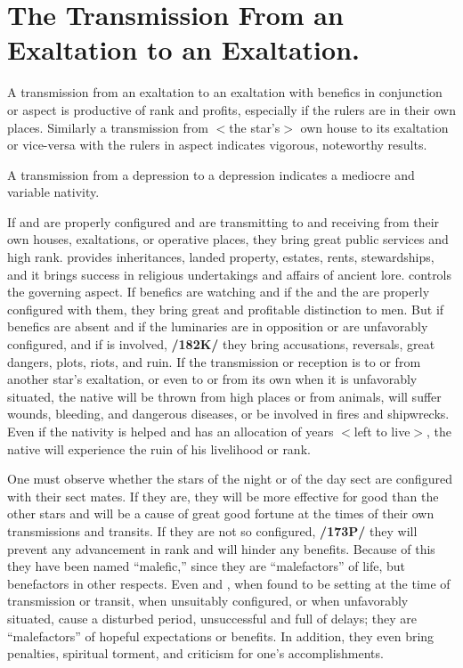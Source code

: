 \section{The Transmission From an Exaltation to an Exaltation.}

A transmission from an exaltation to an exaltation with benefics in conjunction or aspect is productive of rank and profits, especially if the rulers are in their own places. Similarly a transmission from $<$the star’s$>$ own house to its exaltation or vice-versa with the rulers in aspect indicates vigorous, noteworthy results. 

A transmission from a depression to a depression indicates a mediocre and variable nativity.

If \Saturn\xspace and \Mars\xspace are properly configured and are transmitting to and receiving from their own houses,
exaltations, or operative places, they bring great public services and high rank. \Saturn\xspace provides inheritances, landed property, estates, rents, stewardships, and it brings success in religious undertakings and affairs of ancient lore. \Mars\xspace controls the governing aspect. If benefics are watching and if the \Sun\xspace and the \Moon\xspace are properly configured with them, they bring great and profitable distinction to men. But if benefics are absent and if the luminaries are in opposition or are unfavorably configured, and if \Mercury\xspace is involved, \textbf{/182K/} they bring accusations, reversals, great dangers, plots, riots, and ruin.
If the transmission or reception is to or from another star’s exaltation, or even to or from its own when it is unfavorably
situated, the native will be thrown from high places or from animals, will suffer wounds, bleeding, and dangerous diseases, or be involved in fires and shipwrecks. Even if the nativity is helped and has an allocation of years $<$left to live$>$, the native will experience the ruin of his livelihood or rank.

One must observe whether the stars of the night or of the day sect are configured with their sect mates. If they are, they will be more effective for good than the other stars and will be a cause of great good fortune at the times of their own transmissions and transits. If they are not so configured, \textbf{/173P/} they will prevent any advancement in rank and will hinder any benefits. Because of this they have been named “malefic,” since they are “malefactors” of life, but benefactors in other respects. Even \Jupiter\xspace and \Venus, when found to be setting at the time of transmission or transit, when unsuitably configured, or when unfavorably
situated, cause a disturbed period, unsuccessful and full of delays; they are “malefactors” of hopeful expectations or benefits. In addition, they even bring penalties, spiritual torment, and criticism for one’s accomplishments.

\newpage